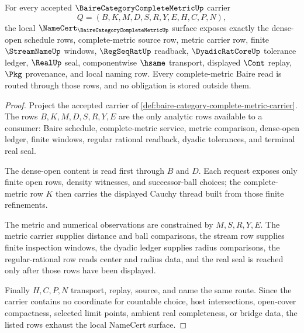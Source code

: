 \begin{theorem}
\label{thm:baire-category-complete-metric-namecert-obligations}
For every accepted $\BaireCategoryCompleteMetricUp$ carrier
$$
Q=(B,K,M,D,S,R,Y,E,H,C,P,N),
$$
the local $\NameCert_{\BaireCategoryCompleteMetricUp}$ surface exposes exactly the dense-open schedule rows, complete-metric source row, metric carrier row, finite $\StreamNameUp$ windows, $\RegSeqRatUp$ readback, $\DyadicRatCoreUp$ tolerance ledger, $\RealUp$ seal, componentwise $\hsame$ transport, displayed $\Cont$ replay, $\Pkg$ provenance, and local naming row. Every complete-metric Baire read is routed through those rows, and no obligation is stored outside them.
\end{theorem}
\begin{proof}
Project the accepted carrier of \autoref{def:baire-category-complete-metric-carrier}. The rows $B,K,M,D,S,R,Y,E$ are the only analytic rows available to a consumer: Baire schedule, complete-metric service, metric comparison, dense-open ledger, finite windows, regular rational readback, dyadic tolerances, and terminal real seal.

The dense-open content is read first through $B$ and $D$. Each request exposes only finite open rows, density witnesses, and successor-ball choices; the complete-metric row $K$ then carries the displayed Cauchy thread built from those finite refinements.

The metric and numerical observations are constrained by $M,S,R,Y,E$. The metric carrier supplies distance and ball comparisons, the stream row supplies finite inspection windows, the dyadic ledger supplies radius comparisons, the regular-rational row reads center and radius data, and the real seal is reached only after those rows have been displayed.

Finally $H,C,P,N$ transport, replay, source, and name the same route. Since the carrier contains no coordinate for countable choice, host intersections, open-cover compactness, selected limit points, ambient real completeness, or bridge data, the listed rows exhaust the local NameCert surface.
\end{proof}

